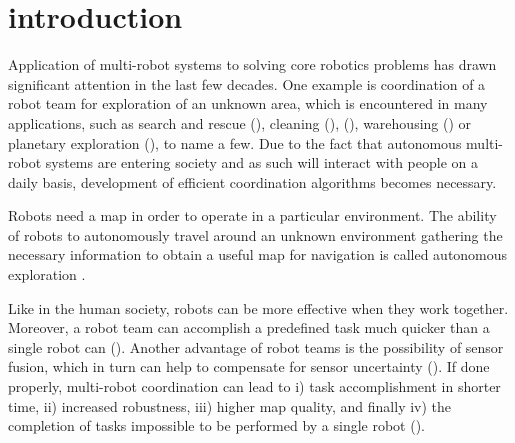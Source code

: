 \section{introduction}


Application of multi-robot systems to solving core robotics problems has drawn significant attention in the last few decades. One example is coordination of a robot team for exploration of an unknown area, which is encountered in many applications, such as search and rescue (\cite{Murphy2004}), cleaning (\cite{Endres}), (\cite{Pinheiro2015}), warehousing (\cite{Wurman2008}) or planetary exploration (\cite{Mataric2001}), to name a few. Due to the fact that autonomous multi-robot systems are entering society and as such will interact with people on a daily basis, development of efficient coordination algorithms becomes necessary.

Robots need a map in order to operate in a particular environment. The ability of robots to autonomously travel around an unknown environment gathering the necessary information to obtain a useful map for navigation is called autonomous exploration \cite{Julia2012}. 

Like in the human society, robots can be more effective when they work together. Moreover, a robot team can accomplish a predefined task much quicker than a single robot can (\cite{Dias2000}). Another advantage of robot teams is the possibility of sensor fusion, which in turn can help to compensate for sensor uncertainty (\cite{Wurm2008}).
If done properly, multi-robot coordination can lead to i) task accomplishment in shorter time, ii) increased robustness, iii) higher map quality, and finally iv) the completion of tasks impossible to be performed by a single robot (\cite{Dias2006}).

